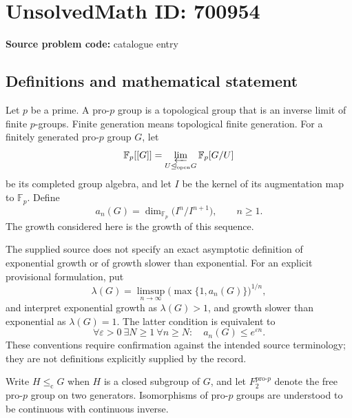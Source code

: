 \documentclass[11pt]{article}
\begin{document}
\section*{UnsolvedMath ID: 700954}
\textbf{Source problem code:} catalogue entry
\subsection{Definitions and mathematical statement}
Let \(p\) be a prime. A pro-\(p\) group is a topological group that is an inverse limit of finite \(p\)-groups. Finite generation means topological finite generation. For a finitely generated pro-\(p\) group \(G\), let
\[
\mathbb F_p[[G]]=\varprojlim_{U\trianglelefteq_{\mathrm{open}}G}\mathbb F_p[G/U]
\]
be its completed group algebra, and let \(I\) be the kernel of its augmentation map to \(\mathbb F_p\). Define
\[
a_n(G)=\dim_{\mathbb F_p}\bigl(I^n/I^{n+1}\bigr),\qquad n\geq 1.
\]
The growth considered here is the growth of this sequence.

The supplied source does not specify an exact asymptotic definition of exponential growth or of growth slower than exponential. For an explicit provisional formulation, put
\[
\lambda(G)=\limsup_{n\to\infty}\bigl(\max\{1,a_n(G)\}\bigr)^{1/n},
\]
and interpret exponential growth as \(\lambda(G)>1\), and growth slower than exponential as \(\lambda(G)=1\). The latter condition is equivalent to
\[
\forall\varepsilon>0\ \exists N\geq1\ \forall n\geq N:\quad a_n(G)\leq e^{\varepsilon n}.
\]
These conventions require confirmation against the intended source terminology; they are not definitions explicitly supplied by the record.

Write \(H\leq_{\mathrm c}G\) when \(H\) is a closed subgroup of \(G\), and let \(F^{\mathrm{pro}\text{-}p}_2\) denote the free pro-\(p\) group on two generators. Isomorphisms of pro-\(p\) groups are understood to be continuous with continuous inverse.
\end{document}
